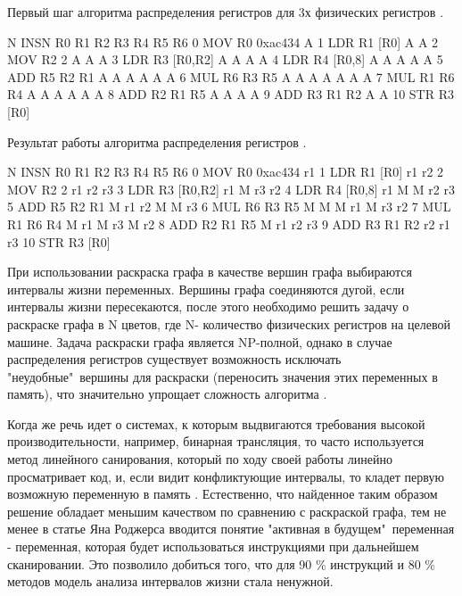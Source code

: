 \begin{ListingEnv}[!h]
\captiondelim{ } 
\caption{Первый шаг алгоритма распределения регистров для 3х физических регистров \cite{melnik2010case}.}\label{partReview:regalloc3}

\begin{Verb}
		N INSN              R0  R1  R2  R3  R4  R5  R6
		0 MOV R0 0xac434    A      
		1 LDR R1 [R0]       A   A
		2 MOV R2 2          A   A   A
		3 LDR R3 [R0,R2]    A   A   A   A
		4 LDR R4 [R0,8]     A   A   A   A   A
		5 ADD R5 R2 R1      A   A   A   A   A   A
		6 MUL R6 R3 R5      A   A   A   A   A   A   A
		7 MUL R1 R6 R4      A   A   A       A   A   A
		8 ADD R2 R1 R5      A   A   A           A
		9 ADD R3 R1 R2      A   A
		10 STR R3 [R0]     
	\end{Verb}
\end{ListingEnv}
\begin{ListingEnv}[!h]
\captiondelim{ } 
\caption{Результат работы алгоритма распределения регистров \cite{melnik2010case}.}\label{partReview:regalloc4}

\begin{Verb}
		N  INSN              R0  R1  R2  R3  R4  R5  R6
		0  MOV R0 0xac434    r1      
		1  LDR R1 [R0]       r1  r2
		2  MOV R2 2          r1  r2  r3
		3  LDR R3 [R0,R2]    r1  M   r3  r2
		4  LDR R4 [R0,8]     r1  M   M   r2  r3
		5  ADD R5 R2 R1      M   r1  r2  M   M   r3
		6  MUL R6 R3 R5      M   M   M   r1  M   r3  r2
		7  MUL R1 R6 R4      M   r1  M       r3  M   r2
		8  ADD R2 R1 R5      M   r1  r2          r3  
		9  ADD R3 R1 R2      r2  r1      r3  
		10 STR R3 [R0]     
	\end{Verb}
\end{ListingEnv}

При использовании раскраска графа в качестве вершин графа выбираются интервалы жизни переменных. Вершины графа соединяются дугой, если интервалы жизни пересекаются, после этого необходимо решить задачу о раскраске графа в N цветов, где N- количество физических регистров на целевой машине. Задача раскраски графа является NP-полной, однако в случае распределения регистров существует возможность исключать "неудобные"\  вершины для раскраски (переносить значения этих переменных в память), что значительно упрощает сложность алгоритма \cite{smith2004generalized, briggs1992register}. 

Когда же речь идет о системах, к которым выдвигаются требования высокой производительности, например, бинарная трансляция, то часто используется метод линейного санирования, который по ходу своей работы линейно просматривает код, и, если видит конфликтующие интервалы, то кладет первую возможную переменную в память \cite{poletto1999linear}. Естественно, что найденное таким образом решение обладает меньшим качеством по сравнению с раскраской графа, тем не менее в статье Яна Роджерса \cite{rogers2020efficient} вводится понятие "активная в будущем"\ переменная - переменная, которая будет использоваться инструкциями при дальнейшем сканировании. Это позволило добиться того, что для 90 \% инструкций и 80 \% методов модель анализа интервалов жизни стала ненужной. 


